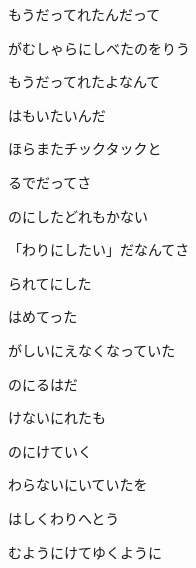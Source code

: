 \documentclass[a4paper,tate,twocolumn,12pt]{ltjtarticle}
\begin{document}
\begin{flushleft}
\vspace{2em}

\noindent\begin{minipage}{\linewidth}
もうだってれたんだって

がむしゃらにしべたのをりう

もうだってれたよなんて

はもいたいんだ
\end{minipage}

\vspace{2em}

\noindent\begin{minipage}{\linewidth}
ほらまたチックタックと

るでだってさ

のにしたどれもかない

「わりにしたい」だなんてさ

られてにした

はめてった
\end{minipage}

\vspace{2em}

\noindent\begin{minipage}{\linewidth}
がしいにえなくなっていた

のにるはだ

けないにれたも

のにけていく
\end{minipage}

\vspace{2em}

\noindent\begin{minipage}{\linewidth}
わらないにいていたを

はしくわりへとう

むようにけてゆくように


\end{minipage}
\end{flushleft}
\end{document}
